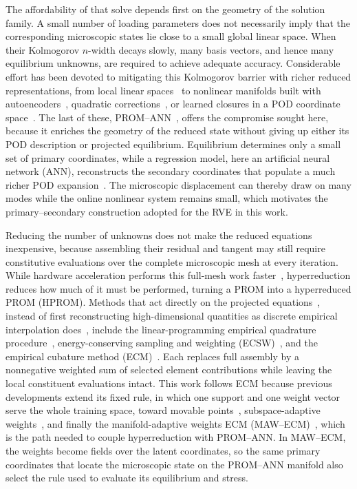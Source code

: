 The affordability of that solve depends first on the geometry of the solution family. A small number of loading parameters does not necessarily imply that the corresponding microscopic states lie close to a small global linear space. When their Kolmogorov $n$-width decays slowly, many basis vectors, and hence many equilibrium unknowns, are required to achieve adequate accuracy. Considerable effort has been devoted to mitigating this Kolmogorov barrier with richer reduced representations, from local linear spaces~\cite{Amsallem2012} to nonlinear manifolds built with autoencoders~\cite{Lee2020}, quadratic corrections~\cite{Barnett2022}, or learned closures in a POD coordinate space~\cite{barnett2023,sibuet2025discrete,aresdeparga2026nonlinear,Chmiel2024}. The last of these, PROM--ANN~\cite{barnett2023}, offers the compromise sought here, because it enriches the geometry of the reduced state without giving up either its POD description or projected equilibrium. Equilibrium determines only a small set of primary coordinates, while a regression model, here an artificial neural network (ANN), reconstructs the secondary coordinates that populate a much richer POD expansion~\cite{aresdeparga2026nonlinear}. The microscopic displacement can thereby draw on many modes while the online nonlinear system remains small, which motivates the primary--secondary construction adopted for the RVE in this work.

Reducing the number of unknowns does not make the reduced equations inexpensive, because assembling their residual and tangent may still require constitutive evaluations over the complete microscopic mesh at every iteration. While hardware acceleration performs this full-mesh work faster~\cite{Fritzen2016}, hyperreduction reduces how much of it must be performed, turning a PROM into a hyperreduced PROM (HPROM). Methods that act directly on the projected equations~\cite{Grimberg2021,AresDeParga2023}, instead of first reconstructing high-dimensional quantities as discrete empirical interpolation does~\cite{Chaturantabut2010}, include the linear-programming empirical quadrature procedure~\cite{patera2017lp,yano2019lp}, energy-conserving sampling and weighting (ECSW)~\cite{Farhat2014,farhat2015}, and the empirical cubature method (ECM)~\cite{hernandez2017,Hernandez2020}. Each replaces full assembly by a nonnegative weighted sum of selected element contributions while leaving the local constituent evaluations intact. This work follows ECM because previous developments extend its fixed rule, in which one support and one weight vector serve the whole training space, toward movable points~\cite{Hernandez2024}, subspace-adaptive weights~\cite{Bravo2024}, and finally the manifold-adaptive weights ECM (MAW--ECM)~\cite{hernandez2026dimensional}, which is the path needed to couple hyperreduction with PROM--ANN. In MAW--ECM, the weights become fields over the latent coordinates, so the same primary coordinates that locate the microscopic state on the PROM--ANN manifold also select the rule used to evaluate its equilibrium and stress.

